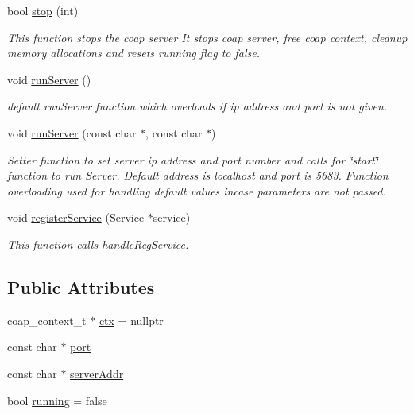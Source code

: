 \begin{DoxyCompactItemize}
\mbox{\label{classcoappbrpc_1_1RpcServer_a93a8e554d0e52b30b79ca8077f040bb2}} 
bool \hyperlink{classcoappbrpc_1_1RpcServer_a93a8e554d0e52b30b79ca8077f040bb2}{stop} (int)
\begin{DoxyCompactList}\small\item\em This function stops the coap server It stops coap server, free coap context, cleanup memory allocations and resets running flag to false. \end{DoxyCompactList}\item 
\mbox{\label{classcoappbrpc_1_1RpcServer_a453e2eb88b54439a1ba249ee66ee912e}} 
void \hyperlink{classcoappbrpc_1_1RpcServer_a453e2eb88b54439a1ba249ee66ee912e}{run\+Server} ()
\begin{DoxyCompactList}\small\item\em default run\+Server function which overloads if ip address and port is not given. \end{DoxyCompactList}\item 
void \hyperlink{classcoappbrpc_1_1RpcServer_ac1742b534bbb7c0b054c40346c876cf5}{run\+Server} (const char $\ast$, const char $\ast$)
\begin{DoxyCompactList}\small\item\em Setter function to set server ip address and port number and calls for \char`\"{}start\char`\"{} function to run Server. Default address is localhost and port is 5683. Function overloading used for handling default values incase parameters are not passed. \end{DoxyCompactList}\item 
void \hyperlink{classcoappbrpc_1_1RpcServer_acc9877a9bfff6783aa0261942d2917c2}{register\+Service} (Service $\ast$service)
\begin{DoxyCompactList}\small\item\em This function calls handle\+Reg\+Service. \end{DoxyCompactList}\end{DoxyCompactItemize}
\subsection*{Public Attributes}
\begin{DoxyCompactItemize}
\item 
coap\+\_\+context\+\_\+t $\ast$ \hyperlink{classcoappbrpc_1_1RpcServer_a34a0db66e265d8986dea6d9e360a7ca3}{ctx} = nullptr
\item 
const char $\ast$ \hyperlink{classcoappbrpc_1_1RpcServer_a9fec802c5d77b168560d14b73fc988e1}{port}
\item 
const char $\ast$ \hyperlink{classcoappbrpc_1_1RpcServer_a14953d39d8e53a7f3dcffde2d15734d0}{server\+Addr}
\item 
bool \hyperlink{classcoappbrpc_1_1RpcServer_a5110ce6a1447e421359982aff15744e2}{running} = false
\end{DoxyCompactItemize}


